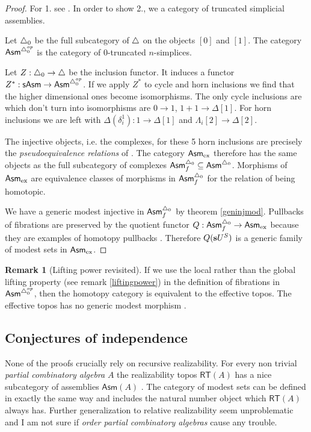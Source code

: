 \documentclass{amsart}
\theoremstyle{plain}
\theoremstyle{definition}
\newtheorem{remark}[theorem]{Remark}
\newcommand\ri{^*}
\newcommand\Asm{\mathsf{Asm}}
\begin{document}
\begin{proof}
For 1. see \cite{MR1981211}. In order to show 2., we a category of truncated simplicial assemblies.

Let ${\mathord{\triangle}}_0$ be the full subcategory of ${\mathord{\triangle}}$ on the objects $[0]$ and $[1]$. The category $\Asm^{\simcat_0\dual}$ is the category of $0$-truncated $n$-simplices.

Let $Z:{\mathord{\triangle}}_0\to{\mathord{\triangle}}$ be the inclusion functor. It induces a functor $Z\ri:\sAsm \to \Asm^{\simcat_0\dual}$. If we apply $Z\ri$ to cycle and horn inclusions we find that the higher dimensional ones become isomorphisms. The only cycle inclusions are which don't turn into isomorphisms are $0\to 1$, $1+1 \to \Delta[1]$. For horn inclusions we are left with $\Delta(\delta^1_i):1\to \Delta[1]$ and $\Lambda_i[2] \to \Delta[2]$.

The injective objects, i.e. the complexes, for these 5 horn inclusions are precisely the \emph{pseudoequivalence relations} of \cite{MR1600009}. The category $\Asm\ex$ therefore has the same objects as the full subcategory of complexes $\Asm^{\simcat_0}_f\subseteq \Asm^{\simcat_0}$. Morphisms of $\Asm\ex$ are equivalence classes of morphisms in $\Asm^{\simcat_0}_f$ for the relation of being homotopic. 

We have a generic modest injective in $\Asm^{\simcat_0}_f$ by theorem \ref{geninjmod}. Pullbacks of fibrations are preserved by the quotient functor $Q:\Asm^{\simcat_0}_f \to\Asm\ex$ because they are examples of homotopy pullbacks \cite{GJSHT}. Therefore $Q(\mathbf{s} U^S)$ is a generic family of modest sets in $\Asm\ex$.
\end{proof}

\begin{remark}[Lifting power revisited] If we use the local rather than the global lifting property (see remark \ref{liftingpower}) in the definition of fibrations in $\Asm^{\simcat_0\dual}$, then the homotopy category is equivalent to the effective topos. The effective topos has no generic modest morphism \cite{MR1023803}. %
\end{remark}

\subsection{Conjectures of independence}
None of the proofs crucially rely on recursive realizability. For every non trivial \emph{partial combinatory algebra} $A$ the realizability topos $\mathsf{RT}(A)$ has a nice subcategory of assemblies $\Asm(A)$ \cite{MR2479466}. The category of modest sets can be defined in exactly the same way and includes the natural number object which $\mathsf{RT}(A)$ always has. Further generalization to relative realizability seem unproblematic and I am not sure if \emph{order partial combinatory algebras} cause any trouble.
\end{document}
